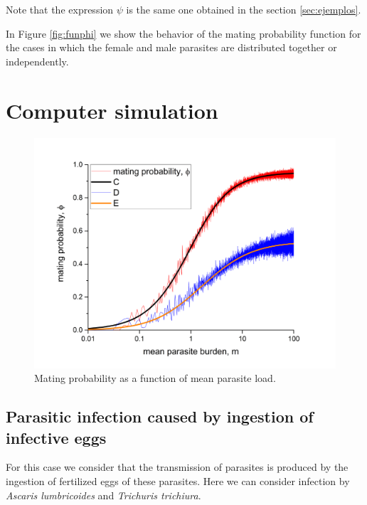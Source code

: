 \documentclass[12pt,a4paper]{article}
\theoremstyle{plain}%
\theoremstyle{definition}
\theoremstyle{remark}
\begin{document}
Note that the expression $\psi$ is the same one obtained in the section \ref{sec:ejemplos}.

	In Figure \ref{fig:funphi} we show the behavior of the mating probability function for the cases in which the female and male parasites are distributed together or independently.


\section{Computer simulation}
\begin{figure}
	\centering 	\includegraphics[width=0.9\linewidth]{mating-prob-nb}
	\caption{Mating probability as a function of mean parasite load.
	} 
\end{figure}
\subsection{Parasitic infection caused by ingestion of infective eggs}
For this case we consider that the transmission of parasites is produced by the ingestion of fertilized eggs of these parasites. Here we can consider infection by \textit{Ascaris lumbricoides} and \textit{Trichuris trichiura}.
\end{document}
